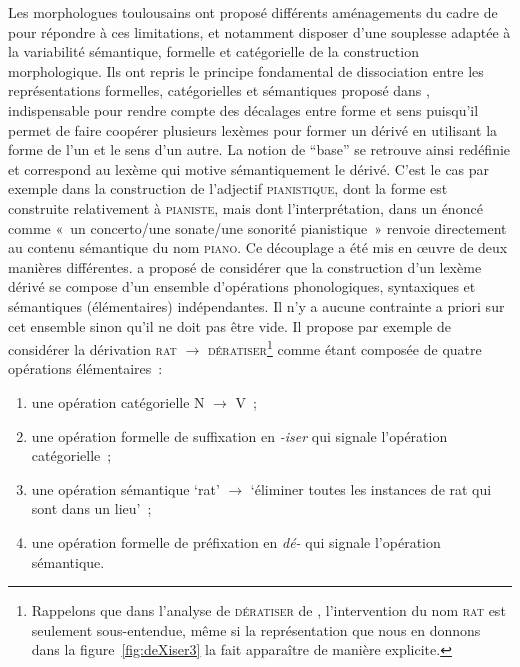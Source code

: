 \documentclass[output=paper]{langsci/langscibook}
\begin{document}
Les morphologues toulousains ont proposé différents aménagements du cadre de \cite{Fradin03} pour répondre à ces limitations, et notamment disposer d'une souplesse adaptée à la variabilité sémantique, formelle et catégorielle de la construction morphologique.
%
Ils ont repris  le principe fondamental de dissociation entre les représentations formelles, catégorielles et sémantiques  proposé dans  \cite[9]{Fradin03}, indispensable pour rendre compte
des décalages entre forme et sens puisqu'il
permet
de faire coopérer plusieurs lexèmes pour former un dérivé en utilisant
la forme de l'un et le sens d'un autre.  La notion de ``base'' se retrouve ainsi redéfinie et correspond au lexème qui motive sémantiquement le dérivé.  C'est le cas par exemple dans la construction de l'adjectif \textsc{pianistique}, dont la forme est construite relativement à \textsc{pianiste}, mais dont l'interprétation, dans un énoncé comme «~un concerto/une sonate/une sonorité pianistique~» renvoie directement au contenu sémantique du nom \textsc{piano}.  Ce découplage a été mis en œuvre de deux manières différentes.  \cite{roche2009.bslp} a proposé de considérer que la construction d'un lexème dérivé se compose d'un ensemble d'opérations phonologiques, syntaxiques et sémantiques (élémentaires) indépendantes.  Il n'y a aucune contrainte a priori sur cet ensemble sinon qu'il ne doit pas être vide.  Il propose par exemple de considérer la dérivation \textsc{rat} $\rightarrow$ \textsc{dératiser}\footnote{%
  Rappelons que dans l'analyse de \textsc{dératiser} de \citet{Fradin03}, l'intervention du nom \textsc{rat} est seulement sous-entendue, même si la représentation que nous en donnons dans la figure~\ref{fig:deXiser3} la fait apparaître de manière explicite.%
} comme étant composée de quatre opérations élémentaires~:
\begin{enumerate}
\item une opération catégorielle N $\rightarrow$ V~;
\item une opération formelle de suffixation en \emph{\mbox{-iser}} qui signale l'opération catégorielle~;
\item une opération sémantique `rat' $\rightarrow$ `éliminer toutes les instances de rat qui sont dans un lieu'~;
\item une opération formelle de préfixation en \emph{\mbox{dé-}} qui signale l'opération sémantique.
\end{enumerate}
\end{document}
